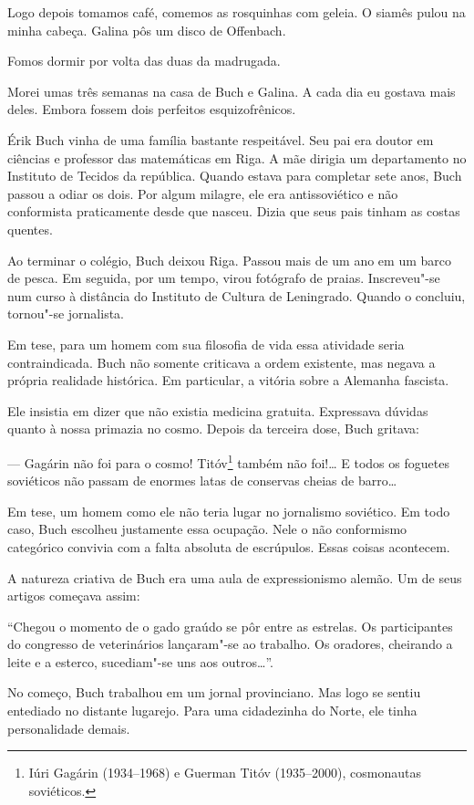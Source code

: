 Logo depois tomamos café, comemos as rosquinhas com geleia. O siamês
pulou na minha cabeça. Galina pôs um disco de Offenbach.

Fomos dormir por volta das duas da madrugada.

Morei umas três semanas na casa de Buch e Galina. A cada dia eu gostava
mais deles. Embora fossem dois perfeitos esquizofrênicos.

Érik Buch vinha de uma família bastante respeitável. Seu pai era doutor
em ciências e professor das matemáticas em Riga. A mãe dirigia um
departamento no Instituto de Tecidos da república. Quando estava para
completar sete anos, Buch passou a odiar os dois. Por algum milagre, ele
era antissoviético e não conformista praticamente desde que nasceu.
Dizia que seus pais tinham as costas quentes.

Ao terminar o colégio, Buch deixou Riga. Passou mais de um ano em um
barco de pesca. Em seguida, por um tempo, virou fotógrafo de praias.
Inscreveu"-se num curso à distância do Instituto de Cultura de
Leningrado. Quando o concluiu, tornou"-se jornalista.

Em tese, para um homem com sua filosofia de vida essa atividade seria
contraindicada. Buch não somente criticava a ordem existente, mas negava
a própria realidade histórica. Em particular, a vitória sobre a Alemanha
fascista.

Ele insistia em dizer que não existia medicina gratuita. Expressava
dúvidas quanto à nossa primazia no cosmo. Depois da terceira dose, Buch
gritava:

--- Gagárin não foi para o cosmo! Titóv\footnote{Iúri Gagárin
  (1934--1968) e Guerman Titóv (1935--2000), cosmonautas soviéticos.}
também não foi!\ldots{} E todos os foguetes soviéticos não passam de enormes
latas de conservas cheias de barro\ldots{}

Em tese, um homem como ele não teria lugar no jornalismo soviético. Em
todo caso, Buch escolheu justamente essa ocupação. Nele o não
conformismo categórico convivia com a falta absoluta de escrúpulos.
Essas coisas acontecem.

A natureza criativa de Buch era uma aula de expressionismo alemão. Um de
seus artigos começava assim:

``Chegou o momento de o gado graúdo se pôr entre as estrelas. Os
participantes do congresso de veterinários lançaram"-se ao trabalho. Os
oradores, cheirando a leite e a esterco, sucediam"-se uns aos
outros\ldots{}''.

No começo, Buch trabalhou em um jornal provinciano. Mas logo se sentiu
entediado no distante lugarejo. Para uma cidadezinha do Norte, ele tinha
personalidade demais.

